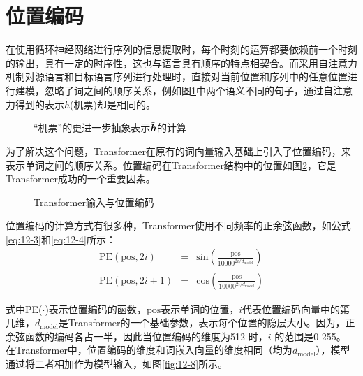 
\section{位置编码}

\parinterval 在使用循环神经网络进行序列的信息提取时，每个时刻的运算都要依赖前一个时刻的输出，具有一定的时序性，这也与语言具有顺序的特点相契合。而采用自注意力机制对源语言和目标语言序列进行处理时，直接对当前位置和序列中的任意位置进行建模，忽略了词之间的顺序关系，例如图\ref{fig:12-6}中两个语义不同的句子，通过自注意力得到的表示$\tilde{h}$(机票)却是相同的。

\begin{figure}[htp]
\centering

\caption{“机票”的更进一步抽象表示$\tilde{\textbf{\em h}}$的计算}
\label{fig:12-6}
\end{figure}

\parinterval 为了解决这个问题，Transformer在原有的词向量输入基础上引入了位置编码，来表示单词之间的顺序关系。位置编码在Transformer结构中的位置如图\ref{fig:12-7}，它是Transformer成功的一个重要因素。

\begin{figure}[htp]
\centering

\caption{Transformer输入与位置编码}
\label{fig:12-7}
\end{figure}

\parinterval 位置编码的计算方式有很多种，Transformer使用不同频率的正余弦函数，如公式\eqref{eq:12-3}和\eqref{eq:12-4}所示：
\begin{eqnarray}
\textrm{PE}(\textrm{pos},2i) & = & \textrm{sin} (\frac{\textrm{pos}}{10000^{2i/d_{\textrm{model}}}}) \label{eq:12-3} \\
\textrm{PE}(\textrm{pos},2i+1) & = & \textrm{cos} (\frac{\textrm{pos}}{10000^{2i/d_{\textrm{model}}}}) \label{eq:12-4}
\end{eqnarray}

\noindent 式中PE($\cdot$)表示位置编码的函数，$\textrm{pos}$表示单词的位置，$i$代表位置编码向量中的第几维，$d_{\textrm{model}}$是Transformer的一个基础参数，表示每个位置的隐层大小。因为，正余弦函数的编码各占一半，因此当位置编码的维度为512 时，$i$ 的范围是0-255。 在Transformer中，位置编码的维度和词嵌入向量的维度相同（均为$d_{\textrm{model}}$），模型通过将二者相加作为模型输入，如图\ref{fig:12-8}所示。

